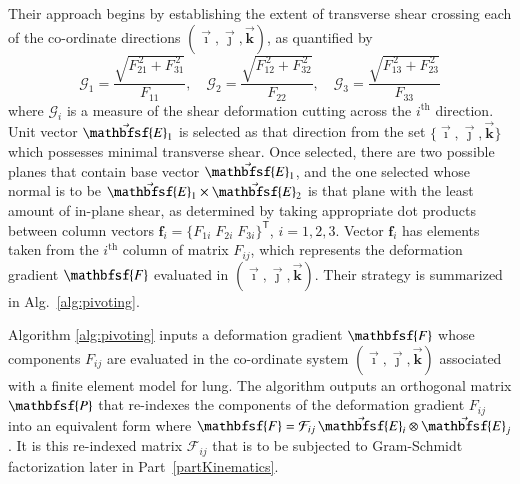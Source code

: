 Their approach begins by establishing the extent of transverse shear crossing each of the co-ordinate directions $( \vec{\boldsymbol{\imath}} , \vec{\boldsymbol{\jmath}} , \vec{\boldsymbol{k}} )$, as quantified by
\begin{equation}
\mathcal{G}_1 =\dfrac{\sqrt{F^{\,2}_{21}+F^{\,2}_{31}}}{F_{11}} , \quad
\mathcal{G}_2 =\dfrac{\sqrt{F^{\,2}_{12}+F^{\,2}_{32}}}{F_{22}} , \quad
\mathcal{G}_3 =\dfrac{\sqrt{F^{\,2}_{13}+F^{\,2}_{23}}}{F_{33}}
\end{equation} 
where $\mathcal{G}_i$ is a measure of the shear deformation cutting across the $i^{\text{th}}$ direction.  Unit vector $\vec{\mathbfsf{E}}_1$ is selected as that direction from the set $\{ \vec{\boldsymbol{\imath}} , \vec{\boldsymbol{\jmath}} , \vec{\boldsymbol{k}} \}$ which possesses minimal transverse shear.  Once selected, there are two possible planes that contain base vector $\vec{\mathbfsf{E}}_1$, and the one selected whose normal is to be $\vec{\mathbfsf{E}}_1 \times \vec{\mathbfsf{E}}_2$ is that plane with the least amount of in-plane shear, as determined by taking appropriate dot products between column vectors $\boldsymbol{f}_i = \{ F_{1i} \; F_{2i} \; F_{3i} \}^{\mathsf{T}}$, $i=1,2,3$.  Vector $\boldsymbol{f}_i$ has elements taken from the $i^{\text{th}}$ column of matrix $F_{ij}$, which represents the deformation gradient $\mathbfsf{F}$ evaluated in $( \vec{\boldsymbol{\imath}} , \vec{\boldsymbol{\jmath}} , \vec{\boldsymbol{k}} )$.  Their strategy is summarized in Alg.~\ref{alg:pivoting}.

Algorithm \ref{alg:pivoting} inputs a deformation gradient $\mathbfsf{F}$ whose components $F_{ij}$ are evaluated in the co-ordinate system $(  \vec{\boldsymbol{\imath}} , \vec{\boldsymbol{\jmath}} , \vec{\boldsymbol{k}} )$ associated with a finite element model for lung.  The algorithm outputs an orthogonal matrix $\mathbfsf{P}$ that re-indexes the components of the deformation gradient $F_{ij}$ into an equivalent form where $\mathbfsf{F} = \mathcal{F}_{ij} \, \vec{\mathbfsf{E}}_i \otimes \vec{\mathbfsf{E}}_j$.  It is this re-indexed matrix $\mathcal{F}_{ij}$ that is to be subjected to Gram-Schmidt factorization later in Part~\ref{partKinematics}.  

